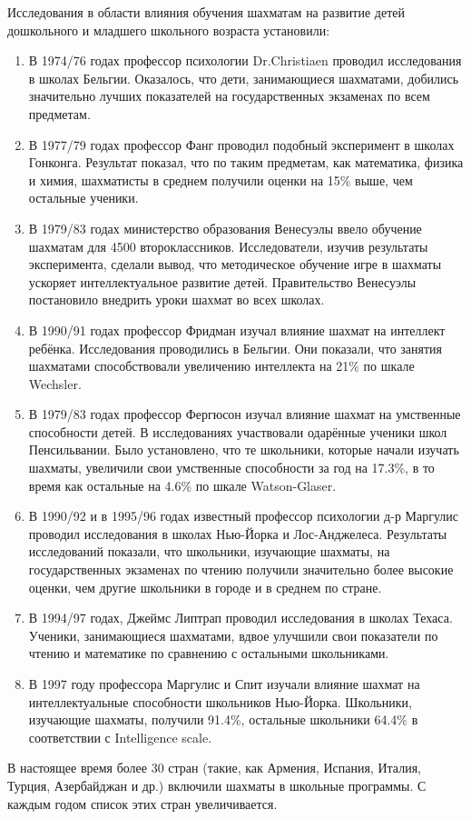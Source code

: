 Исследования в области влияния обучения шахматам на развитие детей дошкольного и младшего школьного возраста установили:
\begin{enumerate}
\item В 1974/76 годах профессор психологии Dr.Christiaen проводил исследования в школах Бельгии. Оказалось, что дети, занимающиеся шахматами, добились значительно лучших показателей на государственных экзаменах по всем предметам.
\item В 1977/79 годах профессор Фанг проводил подобный эксперимент в школах Гонконга. Результат показал, что по таким предметам, как математика, физика и химия, шахматисты в среднем получили оценки на 15\% выше, чем остальные ученики.
\item В 1979/83 годах министерство образования Венесуэлы ввело обучение шахматам для 4500 второклассников. Исследователи, изучив результаты эксперимента, сделали вывод, что методическое обучение игре в шахматы ускоряет интеллектуальное развитие детей. Правительство Венесуэлы постановило внедрить уроки шахмат во всех школах.
\item В 1990/91 годах профессор Фридман изучал влияние шахмат на интеллект ребёнка. Исследования проводились в Бельгии. Они показали, что занятия шахматами способствовали увеличению интеллекта на 21\% по шкале Wechsler.
\item В 1979/83 годах профессор Фергюсон изучал влияние шахмат на умственные способности детей. В исследованиях участвовали одарённые ученики школ Пенсильвании. Было установлено, что те школьники, которые начали изучать шахматы, увеличили свои умственные способности за год на 17.3\%, в то время как остальные на 4.6\% по шкале Watson-Glaser.
\item В 1990/92 и в 1995/96 годах известный профессор психологии д-р Маргулис проводил исследования в школах Нью-Йорка и Лос-Анджелеса. Результаты исследований показали, что школьники, изучающие шахматы, на государственных экзаменах по чтению получили значительно более высокие оценки, чем другие школьники в городе и в среднем по стране.
\item В 1994/97 годах, Джеймс Липтрап проводил исследования в школах Техаса. Ученики, занимающиеся шахматами, вдвое улучшили свои показатели по чтению и математике по сравнению с остальными школьниками.
\item В 1997 году профессора Маргулис и Спит изучали влияние шахмат на интеллектуальные способности школьников Нью-Йорка. Школьники, изучающие шахматы, получили 91.4\%, остальные школьники 64.4\% в соответствии с Intelligence scale.
\end{enumerate}

В настоящее время более 30 стран (такие, как Армения, Испания, Италия, Турция, Азербайджан и др.) включили шахматы в школьные программы. С каждым годом список этих стран увеличивается.
